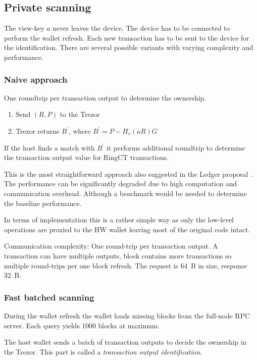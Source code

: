 \documentclass[]{article}
\begin{document}
\subsection{Private scanning}
The view-key $a$ never leaves the device. The device has to be connected
to perform the wallet refresh. 
Each new transaction has to be sent to the device for the identification.
There are several possible variants with varying complexity and performance.

\subsubsection{Naive approach} One roundtrip per transaction output to determine the ownership. 
\begin{enumerate}
	\item Send $(R, P)$ to the Trezor
	\item Trezor returns $B^\prime$, where $B^\prime = P - H_s(aR)G$
\end{enumerate}

If the host finds a match with $B^\prime$ it performs additional roundtrip to determine the transaction output value for RingCT transactions.

This is the most straightforward approach also suggested in the Ledger proposal \cite{ledger_doc}. The performance can be significantly degraded due to high computation and communication overhead. Although a benchmark would be needed to determine the baseline performance.

In terms of implementation this is a rather simple way as only the low-level operations are proxied to the HW wallet leaving most of the original code intact.

Communication complexity: One round-trip per transaction output. A transaction can have multiple outputs, block contains more transactions so multiple round-trips per one block refresh. The request is 64~B in size, response 32~B.

\subsubsection{Fast batched scanning}
During the wallet refresh the wallet loads missing blocks from the full-node RPC server. Each query yields 1000 blocks at maximum. 

The host wallet sends a batch of transaction outputs to decide the ownership in the Trezor. This part is called a \emph{transaction output identification}.
\end{document}

